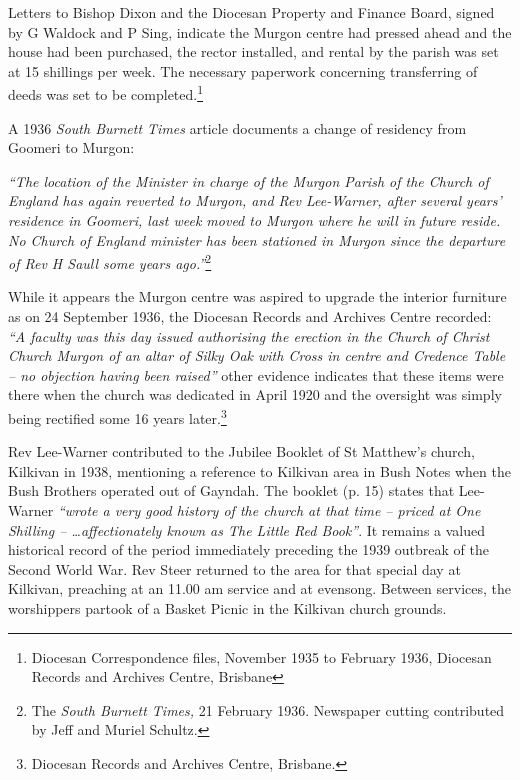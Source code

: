 Letters to Bishop Dixon and the Diocesan Property and Finance Board, signed by G Waldock and P Sing, indicate the Murgon centre had pressed ahead and the house had been purchased, the rector installed, and rental by the parish was set at 15 shillings per week. The necessary paperwork concerning transferring of deeds was set to be completed.\footnote{Diocesan Correspondence files, November 1935 to February 1936, Diocesan Records and Archives Centre, Brisbane}


A 1936 \emph{South Burnett Times} article documents a change of residency from Goomeri to Murgon:



\emph{``The location of the Minister in charge of the Murgon Parish of the Church of England has again reverted to Murgon, and Rev Lee-Warner, after several years' residence in Goomeri, last week moved to Murgon where he will in future reside. No Church of England minister has been stationed in Murgon since the departure of Rev H Saull some years ago.''}\footnote{The \emph{South Burnett Times,} 21 February 1936. Newspaper cutting contributed by Jeff and Muriel Schultz.}


\smallskip


While it appears the Murgon centre was aspired to upgrade the interior furniture as on 24 September 1936, the Diocesan Records and Archives Centre recorded: \emph{``A faculty was this day issued authorising the erection in the Church of Christ Church Murgon of an altar of Silky Oak with Cross in centre and Credence Table -- no objection having been raised''} other evidence indicates that these items were there when the church was dedicated in April 1920 and the oversight was simply being rectified some 16 years later.\footnote{Diocesan Records and Archives Centre, Brisbane.}


Rev Lee-Warner contributed to the Jubilee Booklet of St Matthew's church, Kilkivan in 1938, mentioning a reference to Kilkivan area in Bush Notes when the Bush Brothers operated out of Gayndah. The booklet (p. 15) states that Lee-Warner \emph{``wrote a very good history of the church at that time -- priced at One Shilling -- \ldots affectionately known as The Little Red Book''}. It remains a valued historical record of the period immediately preceding the 1939 outbreak of the Second World War. Rev Steer returned to the area for that special day at Kilkivan, preaching at an 11.00 am service and at evensong. Between services, the worshippers partook of a Basket Picnic in the Kilkivan church grounds.



